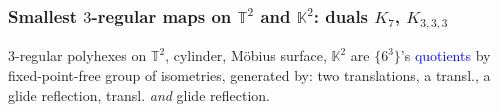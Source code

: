 \documentclass{beamer}
\begin{document}
\begin{frame}\frametitle{Smallest $3$-regular maps on $\mathbb{T}^2$ and 
$\mathbb{K}^2$: duals $K_7$,
$K_{3,3,3}$}
\vspace{-3mm}



\begin{center}
\centering
{}\par
\end{center}\pause

$3$-regular  polyhexes 
on $\mathbb{T}^2$, cylinder,
M\"obius surface, $\mathbb{K}^2$
 are $\{6^3\}$'s \textcolor{blue}{quotients}  by 
fixed-point-free
 group of isometries, generated by:
 two translations, a transl., a glide reflection, transl. {\em and}
glide reflection.


\end{frame}
\end{document}
